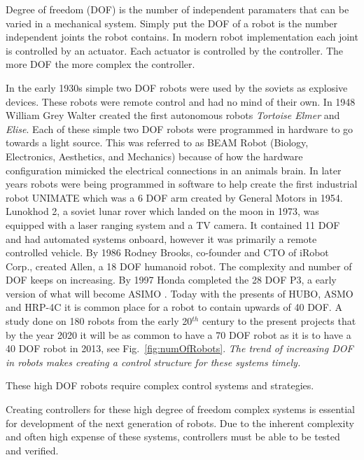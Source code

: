 Degree of freedom (DOF) is the number of independent paramaters that can be varied in a mechanical system.
Simply put the DOF of a robot is the number independent joints the robot contains.
In modern robot implementation each joint is controlled by an actuator.
Each actuator is controlled by the controller.
The more DOF the more complex the controller.

In the early 1930s simple two DOF robots were used by the soviets as explosive devices\cite{robotTelitankSpringer2013military}.
These robots were remote control and had no mind of their own.
In 1948 William Grey Walter created the first autonomous robots \textit{Tortoise Elmer} and \textit{Elise}\cite{robotElmer}.
Each of these simple two DOF robots were programmed in hardware to go towards a light source.  
This was referred to as BEAM Robot (Biology, Electronics, Aesthetics, and Mechanics) because of how the hardware configuration mimicked the electrical connections in an animals brain.
In later years robots were being programmed in software to help create the first industrial robot UNIMATE which was a 6 DOF arm created by General Motors in 1954\cite{handbookOnRobotics2008springer}.  
Lunokhod 2, a soviet lunar rover which landed on the moon in 1973, was equipped with a laser ranging system and a TV camera.
It contained 11 DOF and had automated systems onboard, however it was primarily a remote controlled vehicle.
By 1986 Rodney Brooks, co-founder and CTO of iRobot Corp., created Allen, a 18 DOF humanoid robot.
The complexity and number of DOF keeps on increasing.
By 1997 Honda completed the 28 DOF P3, a early version of what will become ASIMO \cite{robotsAsimo1041641}.
Today with the presents of HUBO, ASMO and HRP-4C it is common place for a robot to contain upwards of 40 DOF.
A study done on 180 robots from the early 20$^{th}$ century to the present projects that by the year 2020 it will be as common to have a 70 DOF robot as it is to have a 40 DOF robot in 2013, see Fig.~\ref{fig:numOfRobots}. 
\textit{The trend of increasing DOF in robots makes creating a control structure for these systems timely.}


These high DOF robots require complex control systems and strategies.



Creating controllers for these high degree of freedom complex systems is essential for development of the next generation of robots.
Due to the inherent complexity and often high expense of these systems, controllers must be able to be tested and verified.



